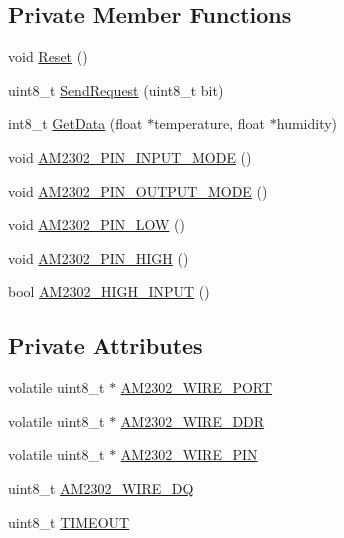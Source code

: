 \subsection*{Private Member Functions}
\begin{DoxyCompactItemize}
\item 
void \hyperlink{classSensors_1_1DHT22_a538ecec2af343da8ff6170df36728931}{Reset} ()
\item 
uint8\+\_\+t \hyperlink{classSensors_1_1DHT22_aa6b9b0e30a17d8744d01a49572e42cfe}{Send\+Request} (uint8\+\_\+t bit)
\item 
int8\+\_\+t \hyperlink{classSensors_1_1DHT22_a1a336900a0f16363f64076efcc318e68}{Get\+Data} (float $\ast$temperature, float $\ast$humidity)
\item 
void \hyperlink{classSensors_1_1DHT22_a3defb05766f77f5d6c5b3ea84ca003cc}{A\+M2302\+\_\+\+P\+I\+N\+\_\+\+I\+N\+P\+U\+T\+\_\+\+M\+O\+DE} ()
\item 
void \hyperlink{classSensors_1_1DHT22_ae9558ae6f38495024ea3f482ebface5c}{A\+M2302\+\_\+\+P\+I\+N\+\_\+\+O\+U\+T\+P\+U\+T\+\_\+\+M\+O\+DE} ()
\item 
void \hyperlink{classSensors_1_1DHT22_a57831c26af2a7eb68ad03189b0de8708}{A\+M2302\+\_\+\+P\+I\+N\+\_\+\+L\+OW} ()
\item 
void \hyperlink{classSensors_1_1DHT22_aa60e4bd1cd75740bb59b6f485002c65a}{A\+M2302\+\_\+\+P\+I\+N\+\_\+\+H\+I\+GH} ()
\item 
bool \hyperlink{classSensors_1_1DHT22_a6c0e691ca8e80a3fcdf32ae8fdd930e3}{A\+M2302\+\_\+\+H\+I\+G\+H\+\_\+\+I\+N\+P\+UT} ()
\end{DoxyCompactItemize}
\subsection*{Private Attributes}
\begin{DoxyCompactItemize}
\item 
volatile uint8\+\_\+t $\ast$ \hyperlink{classSensors_1_1DHT22_a715f00b8b520dc18e0297e16209f474f}{A\+M2302\+\_\+\+W\+I\+R\+E\+\_\+\+P\+O\+RT}
\item 
volatile uint8\+\_\+t $\ast$ \hyperlink{classSensors_1_1DHT22_aac53ea2cdcee5bb0724ed9f627bc83a3}{A\+M2302\+\_\+\+W\+I\+R\+E\+\_\+\+D\+DR}
\item 
volatile uint8\+\_\+t $\ast$ \hyperlink{classSensors_1_1DHT22_a5c1f031275dbd5c220dede4ce8f83700}{A\+M2302\+\_\+\+W\+I\+R\+E\+\_\+\+P\+IN}
\item 
uint8\+\_\+t \hyperlink{classSensors_1_1DHT22_ad581ecb7a40bf65ef4a443ff89c79c7d}{A\+M2302\+\_\+\+W\+I\+R\+E\+\_\+\+DQ}
\item 
uint8\+\_\+t \hyperlink{classSensors_1_1DHT22_ad3a2e38a8a6dafe6afd0d7474cc2f42f}{T\+I\+M\+E\+O\+UT}
\end{DoxyCompactItemize}


